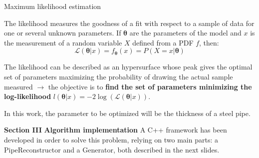 \documentclass[8 pt]{beamer}
\begin{document}
\begin{frame}{Maximum likelihood estimation}
\justifying
\begin{exampleblock}{}
\justifying 
The likelihood measures the goodness of a fit with respect to a sample of data for one or several unknown parameters. If $\bm \theta$ are the parameters of the model and $x$ is the measurement of a random variable $X$ defined from a PDF $f$, then:
\begin{equation*}
\label{eq:likelihood}
\mathcal{L}(\bm \theta | x) = f_{\bm \theta}(x) = P(X = x | \bm \theta)
\end{equation*}
 \end{exampleblock} \vfill

The likelihood can be described as an hypersurface whose peak gives the optimal set of parameters maximizing the probability of drawing the actual sample measured $\rightarrow$ the objective is to \textbf{find the set of parameters minimizing the log-likelihood} $l(\bm \theta | x) = -2 \log(\mathcal{L}(\bm \theta | x))$. \vfill

In this work, the parameter to be optimized will be the thickness of a steel pipe. \vfill
\end{frame}








\begin{frame}{}
\centering
	\huge{\textbf{\color{mycolor} Section III}} \newline
	\LARGE{\textbf{\color{mycolor} Algorithm implementation \color{black}}} \vfill
\Large{A C++ framework has been developed in order to solve this problem, relying on two main parts: a PipeReconstructor and a Generator, both described in the next slides.} \vfill
\end{frame}
\end{document}
